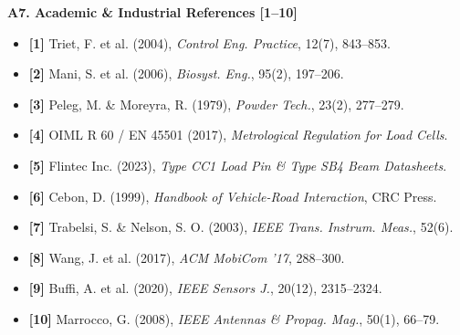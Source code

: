 \documentclass[10pt,a4paper]{article}
\begin{document}
\begin{minipage}[t]{0.485\textwidth}
  \begin{tcolorbox}[colback=white, colframe=bordergray, arc=3pt, boxsep=2pt, left=4pt, right=4pt, top=3pt, bottom=3pt]
  {\fontsize{7.2pt}{8.2pt}\selectfont \textbf{\color{europressred}A7. Academic \& Industrial References [1--10]}}\\[2pt]
  {\fontsize{5.6pt}{6.6pt}\selectfont
  \begin{itemize}
    \item \textbf{[1]} Triet, F. et al. (2004), \textit{Control Eng. Practice}, 12(7), 843--853.
    \item \textbf{[2]} Mani, S. et al. (2006), \textit{Biosyst. Eng.}, 95(2), 197--206.
    \item \textbf{[3]} Peleg, M. \& Moreyra, R. (1979), \textit{Powder Tech.}, 23(2), 277--279.
    \item \textbf{[4]} OIML R 60 / EN 45501 (2017), \textit{Metrological Regulation for Load Cells}.
    \item \textbf{[5]} Flintec Inc. (2023), \textit{Type CC1 Load Pin \& Type SB4 Beam Datasheets}.
    \item \textbf{[6]} Cebon, D. (1999), \textit{Handbook of Vehicle-Road Interaction}, CRC Press.
    \item \textbf{[7]} Trabelsi, S. \& Nelson, S. O. (2003), \textit{IEEE Trans. Instrum. Meas.}, 52(6).
    \item \textbf{[8]} Wang, J. et al. (2017), \textit{ACM MobiCom '17}, 288--300.
    \item \textbf{[9]} Buffi, A. et al. (2020), \textit{IEEE Sensors J.}, 20(12), 2315--2324.
    \item \textbf{[10]} Marrocco, G. (2008), \textit{IEEE Antennas \& Propag. Mag.}, 50(1), 66--79.
  \end{itemize}
  }
  \end{tcolorbox}
\end{minipage}
\end{document}
